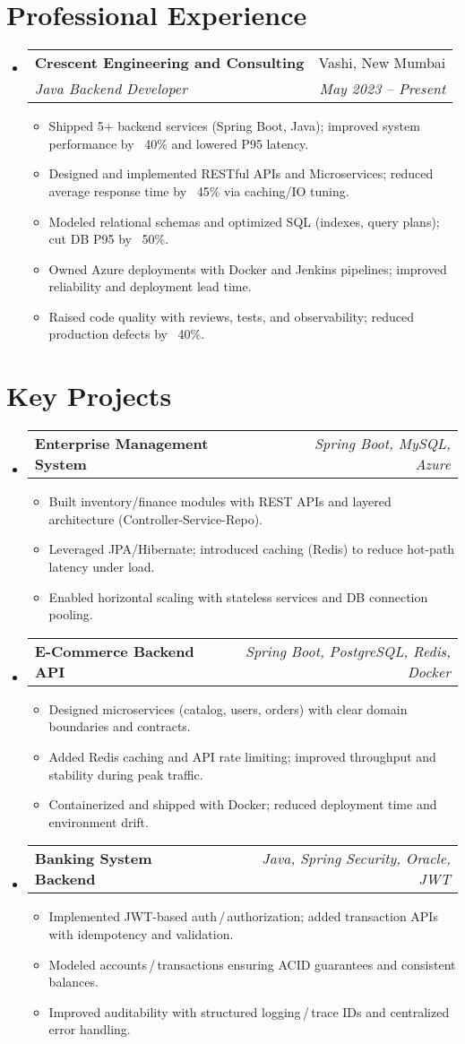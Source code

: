 \documentclass[letterpaper,11pt]{article}
\makeatletter
\newcommand{\resumeItem}[1]{
  \item\small{{#1 \vspace{0pt}}}
}
\newcommand{\resumeSubheading}[4]{
  \vspace{-2pt}\item
    \begin{tabular*}{0.98\textwidth}[t]{l@{\extracolsep{\fill}}r}
      \textbf{#1} & #2 \\
      \textit{\small#3} & \textit{\small #4} \\
    \end{tabular*}\vspace{-7pt}
}
\newcommand{\resumeProjectHeading}[2]{
    \item
    \begin{tabular*}{0.98\textwidth}{l@{\extracolsep{\fill}}r}
      \small\textbf{#1} & \textit{\small #2} \\
    \end{tabular*}\vspace{-7pt}
}
\makeatother
\begin{document}
\section{Professional Experience}
  \begin{itemize}[leftmargin=0.15in]
    \resumeSubheading
      {Crescent Engineering and Consulting}{Vashi, New Mumbai}
      {Java Backend Developer}{May 2023 -- Present}
      \begin{itemize}
        \resumeItem{Shipped 5+ backend services (Spring Boot, Java); improved system performance by ~40\% and lowered P95 latency.}
        \resumeItem{Designed and implemented RESTful APIs and Microservices; reduced average response time by ~45\% via caching/IO tuning.}
        \resumeItem{Modeled relational schemas and optimized SQL (indexes, query plans); cut DB P95 by ~50\%.}
        \resumeItem{Owned Azure deployments with Docker and Jenkins pipelines; improved reliability and deployment lead time.}
        \resumeItem{Raised code quality with reviews, tests, and observability; reduced production defects by ~40\%.}
      \end{itemize}
  \end{itemize}

\section{Key Projects}
  \begin{itemize}[leftmargin=0.15in]
      \resumeProjectHeading
        {Enterprise Management System}{Spring Boot, MySQL, Azure}
        \begin{itemize}
          \resumeItem{Built inventory/finance modules with REST APIs and layered architecture (Controller-Service-Repo).}
          \resumeItem{Leveraged JPA/Hibernate; introduced caching (Redis) to reduce hot-path latency under load.}
          \resumeItem{Enabled horizontal scaling with stateless services and DB connection pooling.}
        \end{itemize}
      \resumeProjectHeading
        {E-Commerce Backend API}{Spring Boot, PostgreSQL, Redis, Docker}
        \begin{itemize}
          \resumeItem{Designed microservices (catalog, users, orders) with clear domain boundaries and contracts.}
          \resumeItem{Added Redis caching and API rate limiting; improved throughput and stability during peak traffic.}
          \resumeItem{Containerized and shipped with Docker; reduced deployment time and environment drift.}
        \end{itemize}
      \resumeProjectHeading
        {Banking System Backend}{Java, Spring Security, Oracle, JWT}
        \begin{itemize}
          \resumeItem{Implemented JWT-based auth\,/\,authorization; added transaction APIs with idempotency and validation.}
          \resumeItem{Modeled accounts\,/\,transactions ensuring ACID guarantees and consistent balances.}
          \resumeItem{Improved auditability with structured logging\,/\,trace IDs and centralized error handling.}
        \end{itemize}
  \end{itemize}
\end{document}
